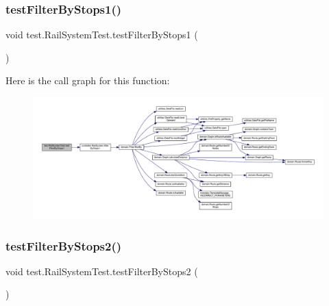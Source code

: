 \subsubsection{\texorpdfstring{test\+Filter\+By\+Stops1()}{testFilterByStops1()}}
{\footnotesize\ttfamily void test.\+Rail\+System\+Test.\+test\+Filter\+By\+Stops1 (\begin{DoxyParamCaption}{ }\end{DoxyParamCaption})}

Here is the call graph for this function\+:\nopagebreak
\begin{figure}[H]
\begin{center}
\leavevmode
\includegraphics[width=350pt]{classtest_1_1_rail_system_test_a788f13f636cb5c25db513fff9fe8668b_cgraph}
\end{center}
\end{figure}
\mbox{\label{classtest_1_1_rail_system_test_a2a1e9411ccf36a39296c00a201f17f37}} 
\subsubsection{\texorpdfstring{test\+Filter\+By\+Stops2()}{testFilterByStops2()}}
{\footnotesize\ttfamily void test.\+Rail\+System\+Test.\+test\+Filter\+By\+Stops2 (\begin{DoxyParamCaption}{ }\end{DoxyParamCaption})}

